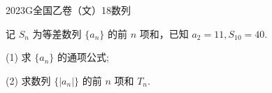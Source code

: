 
\begin{problem}{2023}{G}{全国乙卷（文）}{18}{数列}

记 $S_n$ 为等差数列 $\{a_n\}$ 的前 $n$ 项和，已知 $a_2=11, S_{10}=40$.

(1) 求 $\{a_n\}$ 的通项公式;

(2) 求数列 $\{|a_n|\}$ 的前 $n$ 项和 $T_n$.

\end{problem}